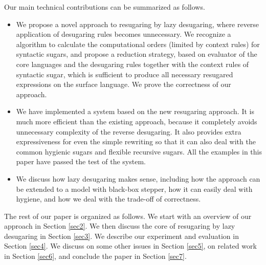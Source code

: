 Our main technical contributions can be summarized as follows.
\begin{itemize}
\item We propose a novel approach to resugaring by lazy desugaring, where reverse application of desugaring rules becomes unnecessary. We recognize a algorithm to calculate the computational orders (limited by context rules) for syntactic sugars, and propose a reduction strategy, based on evaluator of the core languages and the desugaring rules together with the context rules of syntactic sugar, which is sufficient to produce all necessary resugared expressions on the surface language. We prove the correctness of our approach.

\item We have implemented a system based on the new resugaring approach. It is much more efficient than the existing approach, because it completely avoids unnecessary complexity of the reverse desugaring. It also provides extra expressiveness for even the simple rewriting so that it can also deal with the common hygienic sugars and flexible recursive sugars. All the examples in this paper have passed the test of the system. 

\item We discuss how lazy desugaring makes sense, including how the approach can be extended to a model with black-box stepper, how it can easily deal with hygiene, and how we deal with the trade-off of correctness.


\end{itemize}

The rest of our paper is organized as follows. We start with an overview of our approach in Section \ref{sec2}. We then discuss the core of resugaring by lazy desugaring in Section \ref{sec3}. We describe our experiment and evaluation in Section \ref{sec4}. We discuss on some other issues in Section \ref{sec5}, on related work in Section \ref{sec6}, and conclude the paper in Section \ref{sec7}.
